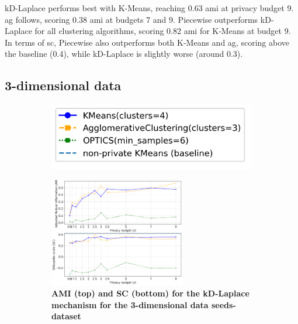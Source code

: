 \begin{figure}[H]
\begin{subfigure}{1\textwidth}
  \end{subfigure}
  \label{fig:validation-skewed-dataset_comparison_2d-laplace}
\end{figure}
kD-Laplace performs best with K-Means, reaching 0.63 \gls{ami} at privacy budget 9.
\gls{ag} follows, scoring 0.38 \gls{ami} at budgets 7 and 9.
Piecewise outperforms kD-Laplace for all clustering algorithms, scoring 0.82 \gls{ami} for K-Means at budget 9.
In terms of \gls{sc}, Piecewise also outperforms both K-Means and \gls{ag}, scoring above the baseline (0.4), while kD-Laplace is slightly worse (around 0.3).
\newpage
\subsection{3-dimensional data}
\begin{figure}[H]
  \centering
  \begin{subfigure}{0.30\textwidth}
    \includegraphics[width=\textwidth]{Results/kd-laplace/kd-Laplace/seeds-dataset/legend_3.png}
  \end{subfigure}
  \begin{subfigure}{1\textwidth}
    \caption{\textbf{AMI (top) and SC (bottom) for the kD-Laplace mechanism for the 3-dimensional data seeds-dataset}}
    \includegraphics[width=0.65\textwidth]{Results/kd-laplace/kd-Laplace/seeds-dataset/ami-and-sc_3_dimensions.png}
    \centering
  \end{subfigure}
  \begin{subfigure}{1\textwidth}

\end{subfigure}
\end{figure}
